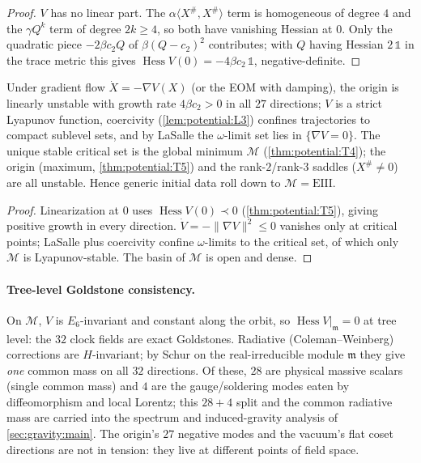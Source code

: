 \begin{proof}
$V$ has no linear part. The $\alpha\langle X^\#,X^\#\rangle$ term is homogeneous of degree $4$
and the $\gamma Q^k$ term of degree $2k\ge4$, so both have vanishing Hessian at $0$. Only the
quadratic piece $-2\beta c_2 Q$ of $\beta(Q-c_2)^2$ contributes; with $Q$ having Hessian
$2\,\mathbb 1$ in the trace metric this gives $\operatorname{Hess}V(0)=-4\beta c_2\,\mathbb 1$,
negative-definite.
\end{proof}

\begin{theorem}
\label{thm:potential:T6}
Under gradient flow $\dot X=-\nabla V(X)$ (or the EOM with damping), the origin is linearly
unstable with growth rate $4\beta c_2>0$ in all $27$ directions; $V$ is a strict Lyapunov
function, coercivity (\autoref{lem:potential:L3}) confines trajectories to compact sublevel
sets, and by LaSalle the $\omega$-limit set lies in $\{\nabla V=0\}$. The unique stable
critical set is the global minimum $\mathcal M$ (\autoref{thm:potential:T4}); the origin
(maximum, \autoref{thm:potential:T5}) and the rank-$2$/rank-$3$ saddles ($X^\#\neq0$) are all
unstable. Hence generic initial data roll down to $\mathcal M=\mathrm{EIII}$.
\end{theorem}

\begin{proof}
Linearization at $0$ uses $\operatorname{Hess}V(0)\prec0$ (\autoref{thm:potential:T5}), giving
positive growth in every direction. $\dot V=-\|\nabla V\|^2\le0$ vanishes only at critical
points; LaSalle plus coercivity confine $\omega$-limits to the critical set, of which only
$\mathcal M$ is Lyapunov-stable. The basin of $\mathcal M$ is open and dense.
\end{proof}

\paragraph{Tree-level Goldstone consistency.}
On $\mathcal M$, $V$ is $E_6$-invariant and constant along the orbit, so
$\operatorname{Hess}V|_{\mathfrak m}=0$ at tree level: the $32$ clock fields are exact
Goldstones. Radiative (Coleman--Weinberg) corrections are $H$-invariant; by Schur on the
real-irreducible module $\mathfrak m$ they give \emph{one} common mass on all $32$ directions.
Of these, $28$ are physical massive scalars (single common mass) and $4$ are the
gauge/soldering modes eaten by diffeomorphism and local Lorentz; this $28+4$ split and the
common radiative mass are carried into the spectrum and induced-gravity analysis of
\autoref{sec:gravity:main}. The origin's $27$ negative modes and the vacuum's flat coset
directions are not in tension: they live at different points of field space.

